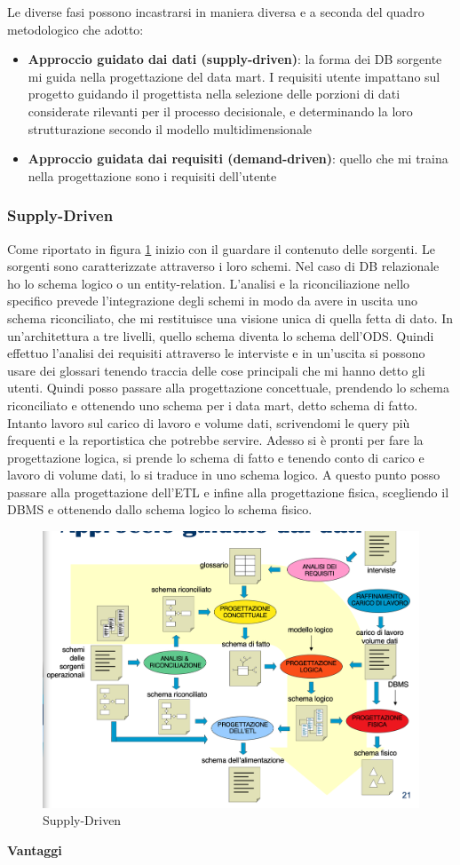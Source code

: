 Le diverse fasi possono incastrarsi in maniera diversa e a seconda del quadro metodologico che adotto:
\begin{itemize}
	\item 
	\textbf{Approccio guidato dai dati (supply-driven)}: la forma dei DB sorgente mi guida nella progettazione del data mart. I requisiti utente impattano sul progetto guidando il progettista nella selezione delle porzioni di dati considerate rilevanti per il processo decisionale, e determinando la loro strutturazione secondo il modello multidimensionale
	\item 
	\textbf{Approccio guidata dai requisiti (demand-driven)}: quello che mi traina nella progettazione sono i requisiti dell’utente
\end{itemize}
\subsubsection{Supply-Driven}
Come riportato in figura \ref{fig:supply} inizio con il guardare il contenuto delle sorgenti. Le sorgenti sono caratterizzate attraverso i loro schemi. Nel caso di DB relazionale ho lo schema logico o un entity-relation. L’analisi e la riconciliazione nello specifico prevede l’integrazione degli schemi in modo da avere in uscita uno schema riconciliato, che mi restituisce una visione unica di quella fetta di dato. In un’architettura a tre livelli, quello schema diventa lo schema dell’ODS. Quindi effettuo l’analisi dei requisiti
attraverso le interviste e in un’uscita si possono usare dei glossari tenendo traccia delle cose principali che mi hanno detto gli utenti. Quindi posso passare alla progettazione concettuale, prendendo lo schema riconciliato e ottenendo uno schema per i data mart, detto schema di fatto. Intanto lavoro sul carico di lavoro e volume dati, scrivendomi le query più frequenti e la reportistica che potrebbe servire. Adesso si è pronti per fare la progettazione logica, si prende lo schema di fatto e tenendo conto di carico e lavoro di volume dati, lo si traduce in uno schema logico. A questo punto posso passare alla progettazione dell’ETL e infine alla progettazione fisica, scegliendo il DBMS e ottenendo dallo schema logico lo schema fisico. 
\begin{figure}[H]
	\centering
	\includegraphics[width=0.7\linewidth]{img/supply-driven}
	\caption{Supply-Driven}
	\label{fig:supply}
\end{figure}
\textbf{Vantaggi}

